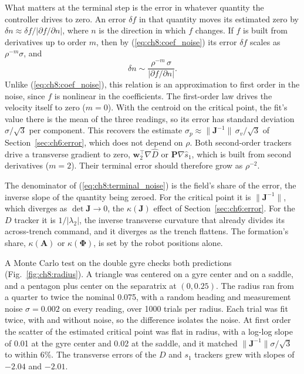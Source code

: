 What matters at the terminal step is the error in whatever quantity the
controller drives to zero. An error $\delta f$ in that quantity moves its
estimated zero by $\delta n \approx \delta f/|\partial f/\partial n|$,
where $n$ is the direction in which $f$ changes. If $f$ is built from
derivatives up to order $m$, then by (\ref{eq:ch8:coef_noise}) its error
$\delta f$ scales as $\rho^{-m}\sigma$, and
\begin{equation}
    \delta n \sim \frac{\rho^{-m}\,\sigma}{|\partial f/\partial n|}.
    \label{eq:ch8:terminal_noise}
\end{equation}
Unlike (\ref{eq:ch8:coef_noise}), this relation is an approximation to
first order in the noise, since $f$ is nonlinear in the coefficients. The
first-order law drives the velocity itself to zero ($m = 0$). With
the centroid on the critical point, the fit's value there is the mean of
the three readings, so its error has standard deviation $\sigma/\sqrt{3}$
per component. This recovers the estimate $\sigma_p \approx
\lVert\mathbf{J}^{-1}\rVert\,\sigma_v/\sqrt{3}$ of
Section~\ref{sec:ch6:error}, which does not depend on $\rho$. Both
second-order trackers drive a transverse gradient to zero,
$\mathbf{w}_2^{\top}\nabla\hat{D}$ or $\mathbf{P}\nabla\hat{s}_1$, which
is built from second derivatives ($m = 2$). Their terminal error should
therefore grow as $\rho^{-2}$.

The denominator of (\ref{eq:ch8:terminal_noise}) is the field's share of
the error, the inverse slope of the quantity being zeroed. For the
critical point it is $\lVert\mathbf{J}^{-1}\rVert$, which diverges as
$\det\mathbf{J} \to 0$, the $\kappa(\mathbf{J})$ effect of
Section~\ref{sec:ch6:error}. For the $D$ tracker it is $1/|\lambda_2|$,
the inverse transverse curvature that already divides its across-trench
command, and it diverges as the trench flattens. The formation's share,
$\kappa(\mathbf{A})$ or $\kappa(\boldsymbol{\Phi})$, is set by the robot
positions alone.

A Monte Carlo test on the double gyre checks both predictions
(Fig.~\ref{fig:ch8:radius}). A triangle was centered on a gyre center and
on a saddle, and a pentagon plus center on the separatrix at
$(0, 0.25)$. The radius ran from a quarter to twice the nominal 0.075,
with a random heading and measurement noise $\sigma = 0.002$ on every
reading, over 1000 trials per radius. Each trial was fit twice, with and
without noise, so the difference isolates the noise. At first order the
scatter of the estimated critical point was flat in radius, with a
log-log slope of 0.01 at the gyre center and 0.02 at the saddle, and it
matched $\lVert\mathbf{J}^{-1}\rVert\sigma/\sqrt{3}$ to within 6\%. The
transverse errors of the $D$ and $s_1$ trackers grew with slopes of
$-2.04$ and $-2.01$.

